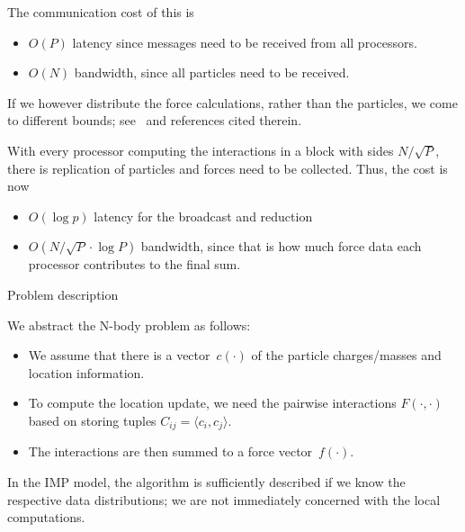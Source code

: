 
The communication cost of this is
\begin{itemize}
\item $O(P)$ latency since messages need to be received from all processors.
\item $O(N)$ bandwidth, since all particles need to be received.
\end{itemize}
If we however distribute the force calculations, rather than the particles,
we come to different bounds; see~\cite{Driscoll:optimal-nbody} and
references cited therein.

With every processor computing the interactions in a block with sides $N/\sqrt P$, 
there is replication of particles and forces need to be collected.
Thus, the cost is now
\begin{itemize}
\item $O(\log p)$ latency for the broadcast and reduction
\item $O(N/\sqrt P\cdot \log P)$ bandwidth, since that is how much
  force data each processor contributes to the final sum.
\end{itemize}

 {Problem description}

We abstract the N-body problem as follows:
\begin{itemize}
\item We assume that there is a vector~$c(\cdot)$
  of the particle charges/masses and location information. 
\item To compute the location update, we need the pairwise
  interactions $F(\cdot,\cdot)$ based on storing tuples
  $C_{ij}=\langle c_i,c_j\rangle$.
\item The interactions are then summed to a force vector~$f(\cdot)$.
\end{itemize}
In the \ac{IMP} model, the algorithm is sufficiently described 
if we know the respective data distributions; we are not immediately concerned with the 
local computations.

